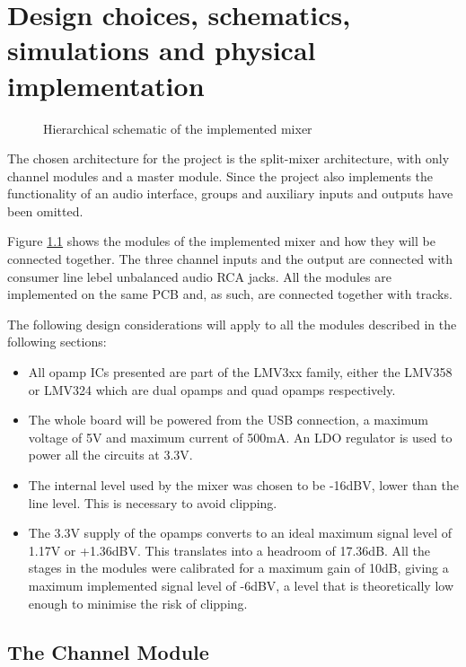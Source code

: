 \chapter{Design choices, schematics, simulations and physical implementation}

\begin{figure}[H]
    \center
    
    \caption{Hierarchical schematic of the implemented mixer}
    \label{fig:sch_root}
\end{figure}

The chosen architecture for the project is the split-mixer architecture, with
only channel modules and a master module. Since the project also implements the
functionality of an audio interface, groups and auxiliary inputs and outputs
have been omitted.

Figure \ref{fig:sch_root} shows the modules of the implemented mixer and how
they will be connected together.
The three channel inputs and the output are connected with consumer line lebel
unbalanced audio RCA jacks. All the modules are implemented on the same PCB
and, as such, are connected together with tracks.

The following design considerations will apply to all the modules described in
the following sections:
\begin{itemize}
    \item All opamp ICs presented are part of the LMV3xx family,
        either the LMV358 or  LMV324 which are dual opamps and quad opamps
        respectively.\cite{lmv3xx}
    \item The whole board will be powered from the USB connection, a maximum
        voltage of 5V and maximum current of 500mA. An LDO regulator is used to
        power all the circuits at 3.3V.
    \item The internal level used by the mixer was chosen to be -16dBV, lower
        than the line level. This is necessary to avoid clipping.
    \item The 3.3V supply of the opamps converts to an ideal maximum signal
        level of 1.17V or +1.36dBV. This translates into a headroom of
        17.36dB. All the stages in the modules were calibrated for a maximum
        gain of 10dB, giving a maximum implemented signal level of -6dBV, a
        level that is theoretically low enough to minimise the risk of
        clipping.
\end{itemize}

\section{The Channel Module}


